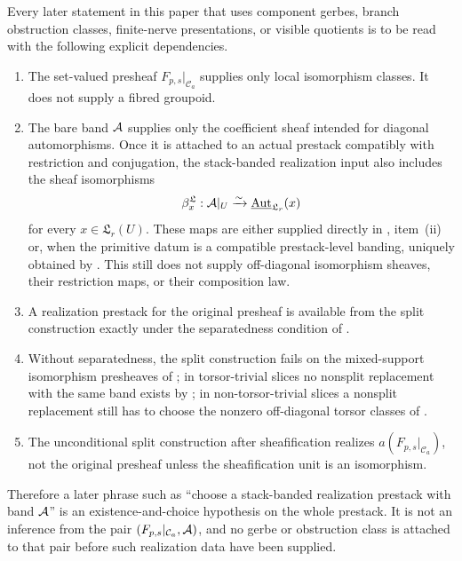\begin{proposition}\label{prop:realization-dependency-ledger}
Every later statement in this paper that uses component gerbes, branch
obstruction classes, finite-nerve presentations, or visible quotients is to be
read with the following explicit dependencies.
\begin{enumerate}[label=(\roman*),nosep]
\item The set-valued presheaf $F_{p,s}|_{\mathcal C_a}$ supplies only local
isomorphism classes. It does not supply a fibred groupoid.
\item The bare band $\mathcal{A}$ supplies only the coefficient sheaf intended for
diagonal automorphisms. Once it is attached to an actual prestack compatibly
with restriction and conjugation, the stack-banded realization input also
includes the sheaf isomorphisms
\[
\beta^{\mathfrak L}_x:\mathcal{A}|_U\xrightarrow{\sim}
\underline{\mathrm{Aut}}_{\mathfrak L_r}(x)
\]
for every $x\in\mathfrak L_r(U)$. These maps are either supplied directly in
, item~\textup{(ii)} or, when the primitive datum is a
compatible prestack-level banding, uniquely obtained by
. This still does not supply
off-diagonal isomorphism sheaves, their restriction maps, or their composition
law.
\item A realization prestack for the original presheaf is available from the
split construction exactly under the separatedness condition of
.
\item Without separatedness, the split construction fails on the mixed-support
isomorphism presheaves of ; in torsor-trivial
slices no nonsplit replacement with the same band exists by
; in non-torsor-trivial slices a
nonsplit replacement still has to choose the nonzero off-diagonal torsor classes
of .
\item The unconditional split construction after sheafification realizes
$a(F_{p,s}|_{\mathcal C_a})$, not the original presheaf unless the
sheafification unit is an isomorphism.
\end{enumerate}
Therefore a later phrase such as ``choose a stack-banded realization prestack
with band $\mathcal{A}$'' is an existence-and-choice hypothesis on the whole
prestack. It is not
an inference from the pair $(F_{p,s}|_{\mathcal C_a},\mathcal{A})$, and no gerbe or
obstruction class is attached to that pair before such realization data have
been supplied.
\end{proposition}

